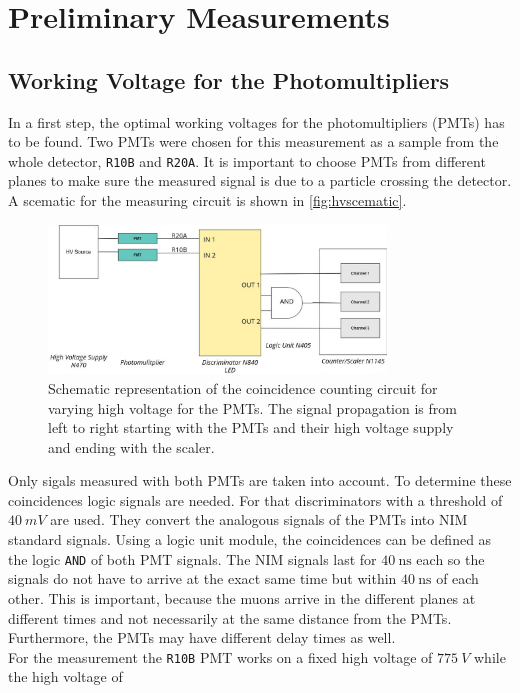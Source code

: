 \chapter{Preliminary Measurements}
\label{sec:prem}
\section{Working Voltage for the Photomultipliers}
In a first step, the optimal working voltages for the photomultipliers (PMTs) has to be found.
Two PMTs were chosen for this measurement as a sample from the whole detector, \texttt{R10B} and \texttt{R20A}.
It is important to choose PMTs from different planes to make sure the measured signal is due to a 
particle crossing the detector. A scematic for the measuring circuit is shown in \autoref{fig:hvscematic}.\\
\begin{figure}
    \centering 
    \includegraphics[width=0.8\textwidth]{figures/hv.jpg}
    \caption{Schematic representation of the coincidence counting circuit for varying high voltage for the PMTs. 
    The signal propagation is from left to right starting with the PMTs and their high voltage supply and ending with the scaler.}
    \label{fig:hvscematic}
\end{figure}
Only sigals measured with both PMTs are taken into account. To determine these coincidences 
logic signals are needed. For that discriminators with a threshold of $\SI{40}{mV}$ are used. 
They convert the analogous signals of the PMTs into NIM standard signals. Using a logic unit module, 
the coincidences can be defined as the logic \texttt{AND} of both PMT signals. The NIM signals 
last for $\SI{40}{\ns}$ each so the signals do not have to arrive at the exact same time but within 
$\SI{40}{\ns}$ of each other. This is important, because the muons arrive in the different planes at different times 
and not necessarily at the same distance from the PMTs. Furthermore, the PMTs may have different
delay times as well.\\
For the measurement the \texttt{R10B} PMT works on a fixed high voltage of $\SI{775}{V}$ while the high voltage of 
